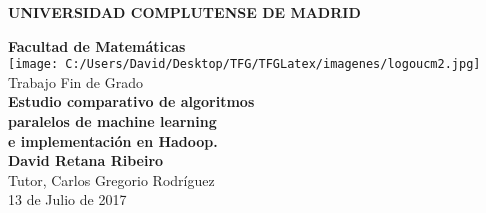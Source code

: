 
\begin{titlepage}
  \begin{center}
    \vspace*{1cm}
    \Huge
    \textbf{UNIVERSIDAD COMPLUTENSE DE MADRID}\\
    \vspace{0.8cm}
    \LARGE

    \textbf{Facultad de Matemáticas}\\
    \vspace{0.5cm}
    \vspace{0.5cm} 
    \texttt{[image: C:/Users/David/Desktop/TFG/TFGLatex/imagenes/logoucm2.jpg]} \\

    Trabajo Fin de Grado\\
    \vspace{0.8cm}
    \Huge
    \textbf{Estudio comparativo de algoritmos}\\
    \textbf{paralelos de machine learning}\\
    \textbf{e implementación en Hadoop.}\\
    \vfill
    \LARGE
    \vspace{1cm}
    \textbf{David Retana Ribeiro}\\
    \vspace{0.5cm}
    Tutor, Carlos Gregorio Rodríguez\\
    \vspace{0.5cm}
    \Large
    13 de Julio de 2017 
  \end{center}
\end{titlepage}

